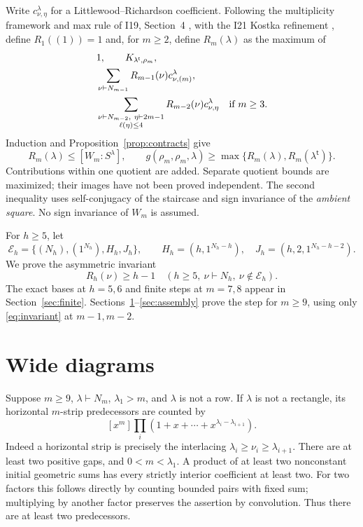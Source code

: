 \documentclass[11pt]{article}
\theoremstyle{remark}\newtheorem{remark}[theorem]{Remark}
\newcommand{\trp}{\mathsf t}\newcommand{\eps}{\varepsilon}
\numberwithin{equation}{section}\setlength{\emergencystretch}{2em}
\begin{document}
Write $c_{\nu,\eta}^{\lambda}$ for a Littlewood--Richardson coefficient.
Following the multiplicity framework and max rule of
I19, Section~4 \cite{I19}, with the I21 Kostka refinement \cite{I21},
define $R_1((1))=1$ and, for $m\ge2$, define $R_m(\lambda)$ as the maximum of
\begin{align}
 &1,\qquad K_{\lambda^{\trp},\rho_m},\label{eq:Rdef}\\
 &\sum_{\nu\vdash N_{m-1}}R_{m-1}(\nu)c_{\nu,(m)}^{\lambda},\notag\\
 &\sum_{\substack{\nu\vdash N_{m-2},\ \eta\vdash2m-1\\\len(\eta)\le4}}
       R_{m-2}(\nu)c_{\nu,\eta}^{\lambda}
       \quad\text{if }m\ge3.\notag
\end{align}
Induction and Proposition~\ref{prop:contracts} give
\begin{equation}\label{eq:Rvalid}
 R_m(\lambda)\le[W_m:S^\lambda],\qquad
 g(\rho_m,\rho_m,\lambda)\ge
       \max\{R_m(\lambda),R_m(\lambda^{\trp})\}.
\end{equation}
Contributions within one quotient are added. Separate quotient bounds
are maximized; their images have not been proved independent. The second
inequality uses self-conjugacy of the staircase and sign invariance of the
\emph{ambient square}. No sign invariance of $W_m$ is assumed.

For $h\ge5$, let
\begin{equation}\label{eq:exceptions}
 \mathcal E_h=\{(N_h),(1^{N_h}),H_h,J_h\},\qquad
 H_h=(h,1^{N_h-h}),\quad J_h=(h,2,1^{N_h-h-2}).
\end{equation}
We prove the asymmetric invariant
\begin{equation}\label{eq:invariant}
 R_h(\nu)\ge h-1\quad(h\ge5,\ \nu\vdash N_h,\ \nu\notin\mathcal E_h).
\end{equation}
The exact bases at $h=5,6$ and finite steps at $m=7,8$ appear in
Section~\ref{sec:finite}. Sections~\ref{sec:wide}--\ref{sec:assembly}
prove the step for $m\ge9$, using only \eqref{eq:invariant} at $m-1,m-2$.

\section{Wide diagrams}\label{sec:wide}
Suppose $m\ge9$, $\lambda\vdash N_m$, $\lambda_1>m$, and $\lambda$ is
not a row. If $\lambda$ is not a rectangle, its horizontal $m$-strip
predecessors are counted by
\begin{equation}\label{eq:hstripcount}
 [x^m]\prod_i(1+x+\cdots+x^{\lambda_i-\lambda_{i+1}}).
\end{equation}
Indeed a horizontal strip is precisely the interlacing
$\lambda_i\ge\nu_i\ge\lambda_{i+1}$. There are at least two positive
gaps, and $0<m<\lambda_1$. A product of at least two nonconstant initial
geometric sums has every strictly interior coefficient at least two.
For two factors this follows directly by counting bounded pairs with
fixed sum; multiplying by another factor preserves the assertion by
convolution. Thus there are at least two predecessors.
\end{document}
